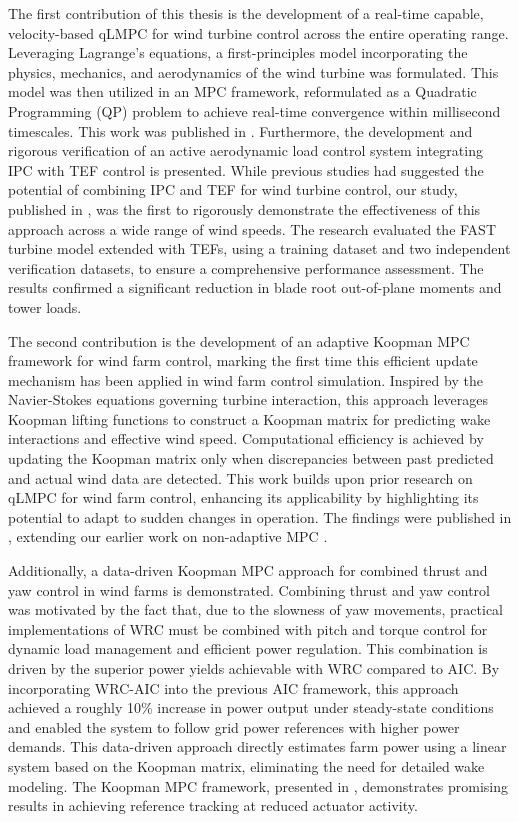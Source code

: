 The first contribution of this thesis is the development of a real-time capable, velocity-based qLMPC for wind turbine control across the entire operating range. Leveraging Lagrange's equations, a first-principles model incorporating the physics, mechanics, and aerodynamics of the wind turbine was formulated. This model was then utilized in an MPC framework, reformulated as a Quadratic Programming (QP) problem to achieve real-time convergence within millisecond timescales. This work was published in \cite{dittmer2021velocity}.
%
Furthermore, the development and rigorous verification of an active aerodynamic load control system integrating IPC with TEF control is presented. While previous studies had suggested the potential of combining IPC and TEF for wind turbine control, our study, published in \cite{dittmer2024combined}, was the first to rigorously demonstrate the effectiveness of this approach across a wide range of wind speeds. The research evaluated the FAST turbine model extended  with TEFs, using a training dataset and two independent verification datasets, to ensure a comprehensive performance assessment. The results confirmed a significant reduction in blade root out-of-plane moments and tower loads.

The second contribution is the development of an adaptive Koopman MPC framework for wind farm control, marking the first time this efficient update mechanism has been applied in wind farm control simulation. Inspired by the Navier-Stokes equations governing turbine interaction, this approach leverages Koopman lifting functions to construct a Koopman matrix for predicting wake interactions and effective wind speed. Computational efficiency is achieved by updating the Koopman matrix only when discrepancies between past predicted and actual wind data are detected. This work builds upon prior research on qLMPC for wind farm control, enhancing its applicability by highlighting its potential to adapt to sudden changes in operation. The findings were published in \cite{dittmer2022data}, extending our earlier work on non-adaptive MPC \cite{sharan2022Koopman}.

Additionally, a data-driven Koopman MPC approach for combined thrust and yaw control in wind farms is demonstrated. Combining thrust and yaw control was motivated by the fact that, due to the slowness of yaw movements, practical implementations of WRC must be combined with pitch and torque control for dynamic load management and efficient power regulation. This combination is driven by the superior power yields achievable with WRC compared to AIC. By incorporating WRC-AIC into the previous AIC framework, this approach achieved a roughly 10\% increase in power output under steady-state conditions and enabled the system to follow grid power references with higher power demands. This data-driven approach directly estimates farm power using a linear system based on the Koopman matrix, eliminating the need for detailed wake modeling. The Koopman MPC framework, presented in \cite{dittmer2023koopman}, demonstrates promising results in achieving reference tracking at reduced actuator activity.

